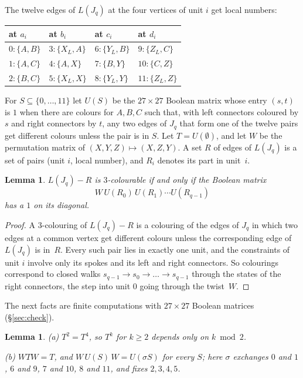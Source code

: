 \documentclass[11pt]{amsart}
\newtheorem{lemma}[theorem]{Lemma}
\theoremstyle{remark}
\begin{document}
The twelve edges of $L(J_q)$ at the four vertices of unit $i$ get local numbers:
\begin{center}\small
\begin{tabular}{llll}
\toprule
at $a_i$ & at $b_i$ & at $c_i$ & at $d_i$\\
\midrule
$0:\{A,B\}$ & $3:\{X_L,A\}$ & $6:\{Y_L,B\}$ & $9:\{Z_L,C\}$\\
$1:\{A,C\}$ & $4:\{A,X\}$ & $7:\{B,Y\}$ & $10:\{C,Z\}$\\
$2:\{B,C\}$ & $5:\{X_L,X\}$ & $8:\{Y_L,Y\}$ & $11:\{Z_L,Z\}$\\
\bottomrule
\end{tabular}
\end{center}
For $S\subseteq\{0,\dots,11\}$ let $U(S)$ be the $27\times27$ Boolean matrix whose entry $(s,t)$ is $1$ when
there are colours for $A,B,C$ such that, with left connectors coloured by $s$ and right connectors by $t$, any two
edges of $J_q$ that form one of the twelve pairs get different colours unless the pair is in $S$. Let
$T=U(\emptyset)$, and let $W$ be the permutation matrix of $(X,Y,Z)\mapsto(X,Z,Y)$. A set $R$ of edges of $L(J_q)$
is a set of pairs (unit $i$, local number), and $R_i$ denotes its part in unit~$i$.

\begin{lemma}\label{lem:trace}
$L(J_q)-R$ is $3$-colourable if and only if the Boolean matrix
\[W\,U(R_0)\,U(R_1)\cdots U(R_{q-1})\]
has a $1$ on its diagonal.
\end{lemma}
\begin{proof}
A $3$-colouring of $L(J_q)-R$ is a colouring of the edges of $J_q$ in which two edges at a common vertex get
different colours unless the corresponding edge of $L(J_q)$ is in~$R$. Every such pair lies in exactly one unit,
and the constraints of unit $i$ involve only its spokes and its left and right connectors. So colourings
correspond to closed walks $s_{q-1}\to s_0\to\dots\to s_{q-1}$ through the states of the right connectors, the
step into unit $0$ going through the twist~$W$.
\end{proof}

The next facts are finite computations with $27\times27$ Boolean matrices (\S\ref{sec:check}).

\begin{lemma}\label{lem:facts}
\textup{(a)} $T^2=T^4$, so $T^k$ for $k\ge2$ depends only on $k\bmod2$.

\noindent\textup{(b)} $WTW=T$, and $W\,U(S)\,W=U(\sigma S)$ for every $S$; here $\sigma$ exchanges $0$ and $1$,
$6$ and $9$, $7$ and $10$, $8$ and $11$, and fixes $2,3,4,5$.
\end{lemma}
\end{document}
